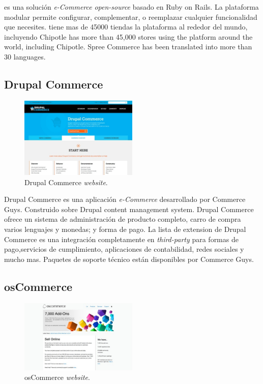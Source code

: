 \nameSpreeCommerce es una solución \textit{e-Commerce} \textit{open-source}  basado en Ruby on Rails. La plataforma modular permite configurar, complementar, o reemplazar cualquier funcionalidad que necesites. \nameSpreeCommerce tiene mas de 45000 tiendas la plataforma al rededor del mundo, incluyendo Chipotle\cite{online_Chipotle} has more than 45,000 stores using the platform around the world, including Chipotle. Spree Commerce has been translated into more than 30 languages.

\newcommand{\nameDrupalCommerce}{Drupal Commerce }
\subsection{\nameDrupalCommerce}

\begin{figure}[h!]
	\centering
	\includegraphics[width=0.5\textwidth]{figuras/cap1/DrupalCommerceWebsite.jpg}
	\caption{\nameDrupalCommerce \textit{website}\cite{online_DrupalCommerce}.}
\end{figure}	

\nameDrupalCommerce es una aplicación \textit{e-Commerce} desarrollado por  Commerce Guys. Construido sobre Drupal content management system. \nameDrupalCommerce ofrece un sistema de administración de producto completo, carro de compra varios lenguajes y monedas; y forma de pago. La lista de extension de \nameDrupalCommerce es una integración completamente en\textit{ third-party} para formas de pago,servicios de cumplimiento, aplicaciones de contabilidad, redes sociales y mucho mas. Paquetes de soporte técnico están disponibles por Commerce Guys.

\newcommand{\nameOsCommerce}{osCommerce }
\subsection{\nameOsCommerce}

\begin{figure}[h!]
	\centering
	\includegraphics[width=0.5\textwidth]{figuras/cap1/osCommerceWebsite.jpg}
	\caption{\nameOsCommerce \textit{website}\cite{online_osCommerce}.}
\end{figure}

